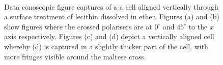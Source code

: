 \begin{figure}
\begin{center}
\\
\end{center}
\caption[Conoscopic figures from a vertically aligned cell]{\label{fig:homeotropic_cell}Data conoscopic figure captures of a a cell aligned vertically through a surface treatment of lecithin dissolved in ether. Figures (a) and (b) show figures where the crossed polarisers are at $0^{\circ}$ and $45^{\circ}$ to the $x$ axis respectively. Figures (c) and (d) depict a vertically aligned cell whereby (d) is captured in a slightly thicker part of the cell, with more fringes visible around the maltese cross.}
\end{figure}

